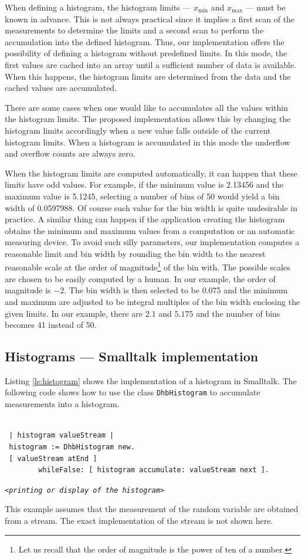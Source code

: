 \documentclass[twoside]{book}
\begin{document}
When defining a histogram, the histogram limits --- $x_{\min}$ and
$x_{\max}$ --- must be known in advance. This is not always
practical since it implies a first scan of the measurements to
determine the limits and a second scan to perform the accumulation
into the defined histogram. Thus, our implementation offers the
possibility of defining a histogram without predefined limits. In
this mode, the first values are cached into an array until a
sufficient number of data is available. When this happens, the
histogram limits are determined from the data and the cached
values are accumulated.

There are some cases when one would like to accumulates all the
values within the histogram limits. The proposed implementation
allows this by changing the histogram limits accordingly when a
new value falls outside of the current histogram limits. When a
histogram is accumulated in this mode the underflow and overflow
counts are always zero.

When the histogram limits are computed automatically, it can
happen that these limits have odd values. For example, if the
minimum value is 2.13456 and the maximum value is 5.1245,
selecting a number of bins of 50 would yield a bin width of
0.0597988. Of course such value for the bin width is quite
undesirable in practice. A similar thing can happen if the
application creating the histogram obtains the minimum and maximum
values from a computation or an automatic measuring device. To
avoid such silly parameters, our implementation computes a
reasonable limit and bin width by rounding the bin width to the
nearest reasonable scale at the order of magnitude\footnote{Let us
recall that the order of magnitude is the power of ten of a
number.} of the bin with. The possible scales are chosen to be
easily computed by a human. In our example, the order of magnitude
is $-2$. The bin width is then selected to be 0.075 and the
minimum and maximum are adjusted to be integral multiples of the
bin width enclosing the given limits. In our example, there are
$2.1$ and $5.175$ and the number of bins becomes 41 instead of 50.

\subsection{Histograms --- Smalltalk implementation}
\label{sec:shistogram} Listing \ref{ls:histogram} shows the
implementation of a histogram in Smalltalk. The following code
shows how to use the class {\tt DhbHistogram} to accumulate
measurements into a histogram.
\begin{codeExample}
\begin{verbatim}

 | histogram valueStream |
 histogram := DhbHistogram new.
 [ valueStream atEnd ]
        whileFalse: [ histogram accumulate: valueStream next ].
\end{verbatim}
\hfil {\tt<\sl printing or display of the histogram\tt >}\hfil
\end{codeExample}
This example assumes that the measurement of the random variable
are obtained from a stream. The exact implementation of the stream
is not shown here.
\end{document}
